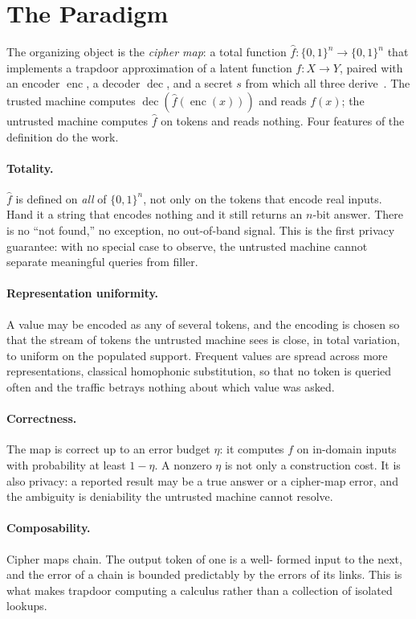 \documentclass[11pt]{article}
\newcommand{\fhat}{\hat{f}}
\newcommand{\enc}{\operatorname{enc}}
\newcommand{\dec}{\operatorname{dec}}
\newcommand{\B}{\{0,1\}}
\begin{document}
\section{The Paradigm}
\label{sec:paradigm}

The organizing object is the \emph{cipher map}: a total function $\fhat : \B^n
\to \B^n$ that implements a trapdoor approximation of a latent function
$f : X \to Y$, paired with an encoder $\enc$, a decoder $\dec$, and a secret
$s$ from which all three derive~\cite{towell2026cipher}. The trusted machine
computes $\dec(\fhat(\enc(x)))$ and reads $f(x)$; the untrusted machine
computes $\fhat$ on tokens and reads nothing. Four features of the definition
do the work.

\paragraph{Totality.} $\fhat$ is defined on \emph{all} of $\B^n$, not only on
the tokens that encode real inputs. Hand it a string that encodes nothing and
it still returns an $n$-bit answer. There is no ``not found,'' no exception, no
out-of-band signal. This is the first privacy guarantee: with no special case
to observe, the untrusted machine cannot separate meaningful queries from
filler.

\paragraph{Representation uniformity.} A value may be encoded as any of several
tokens, and the encoding is chosen so that the stream of tokens the untrusted
machine sees is close, in total variation, to uniform on the populated support.
Frequent values are spread across more representations, classical homophonic
substitution, so that no token is queried often and the traffic betrays nothing
about which value was asked.

\paragraph{Correctness.} The map is correct up to an error budget $\eta$: it
computes $f$ on in-domain inputs with probability at least $1 - \eta$. A nonzero
$\eta$ is not only a construction cost. It is also privacy: a reported result
may be a true answer or a cipher-map error, and the ambiguity is deniability
the untrusted machine cannot resolve.

\paragraph{Composability.} Cipher maps chain. The output token of one is a well-%
formed input to the next, and the error of a chain is bounded predictably by
the errors of its links. This is what makes trapdoor computing a calculus
rather than a collection of isolated lookups.
\end{document}

